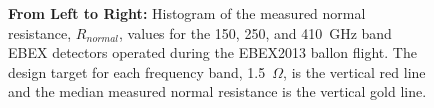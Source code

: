 \begin{figure}[ht!]
\centering
{}
\caption{\textbf{From Left to Right:} Histogram of the measured normal resistance, $R_{normal}$, values for the 150, 250, and 410~GHz band \ac{EBEX} detectors operated during the \ac{EBEX2013} ballon flight. The design target for each frequency band, 1.5~$\Omega$, is the vertical red line and the median measured normal resistance is the vertical gold line.}
\label{fig:rn_histograms}
\end{figure}

